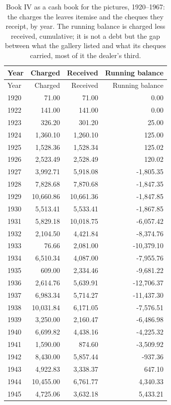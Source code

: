 \begin{longtable}{lrrr}
\caption{Book IV as a cash book for the pictures, 1920--1967: the charges the leaves itemise and the cheques they receipt, by year. The running balance is charged less received, cumulative; it is not a debt but the gap between what the gallery listed and what its cheques carried, most of it the dealer's third.}\label{tab:cash}\\\toprule Year & Charged & Received & Running balance\\\midrule\endfirsthead
\toprule Year & Charged & Received & Running balance\\\midrule\endhead
1920 & 71.00 & 71.00 & 0.00\\
1922 & 141.00 & 141.00 & 0.00\\
1923 & 326.20 & 301.20 & 25.00\\
1924 & 1,360.10 & 1,260.10 & 125.00\\
1925 & 1,528.36 & 1,528.34 & 125.02\\
1926 & 2,523.49 & 2,528.49 & 120.02\\
1927 & 3,992.71 & 5,918.08 & -1,805.35\\
1928 & 7,828.68 & 7,870.68 & -1,847.35\\
1929 & 10,660.86 & 10,661.36 & -1,847.85\\
1930 & 5,513.41 & 5,533.41 & -1,867.85\\
1931 & 5,829.18 & 10,018.75 & -6,057.42\\
1932 & 2,104.50 & 4,421.84 & -8,374.76\\
1933 & 76.66 & 2,081.00 & -10,379.10\\
1934 & 6,510.34 & 4,087.00 & -7,955.76\\
1935 & 609.00 & 2,334.46 & -9,681.22\\
1936 & 2,614.76 & 5,639.91 & -12,706.37\\
1937 & 6,983.34 & 5,714.27 & -11,437.30\\
1938 & 10,031.84 & 6,171.05 & -7,576.51\\
1939 & 3,250.00 & 2,160.47 & -6,486.98\\
1940 & 6,699.82 & 4,438.16 & -4,225.32\\
1941 & 1,590.00 & 874.60 & -3,509.92\\
1942 & 8,430.00 & 5,857.44 & -937.36\\
1943 & 4,922.83 & 3,338.37 & 647.10\\
1944 & 10,455.00 & 6,761.77 & 4,340.33\\
1945 & 4,725.06 & 3,632.18 & 5,433.21\\

\end{longtable}
